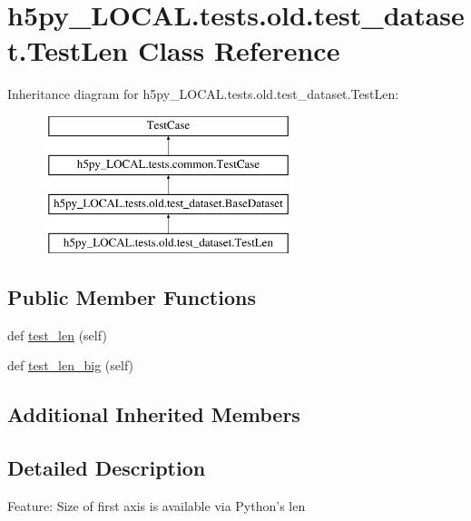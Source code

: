 \hypertarget{classh5py__LOCAL_1_1tests_1_1old_1_1test__dataset_1_1TestLen}{}\section{h5py\+\_\+\+L\+O\+C\+A\+L.\+tests.\+old.\+test\+\_\+dataset.\+Test\+Len Class Reference}
\label{classh5py__LOCAL_1_1tests_1_1old_1_1test__dataset_1_1TestLen}
Inheritance diagram for h5py\+\_\+\+L\+O\+C\+A\+L.\+tests.\+old.\+test\+\_\+dataset.\+Test\+Len\+:\begin{figure}[H]
\begin{center}
\leavevmode
\includegraphics[height=4.000000cm]{classh5py__LOCAL_1_1tests_1_1old_1_1test__dataset_1_1TestLen}
\end{center}
\end{figure}
\subsection*{Public Member Functions}
\begin{DoxyCompactItemize}
\item 
def \hyperlink{classh5py__LOCAL_1_1tests_1_1old_1_1test__dataset_1_1TestLen_a7f32a6ac3f664ad8b47e668a98a1d65d}{test\+\_\+len} (self)
\item 
def \hyperlink{classh5py__LOCAL_1_1tests_1_1old_1_1test__dataset_1_1TestLen_a4b1f28f9e697e4be4171161683b43b3c}{test\+\_\+len\+\_\+big} (self)
\end{DoxyCompactItemize}
\subsection*{Additional Inherited Members}


\subsection{Detailed Description}
\begin{DoxyVerb}    Feature: Size of first axis is available via Python's len
\end{DoxyVerb}
 

